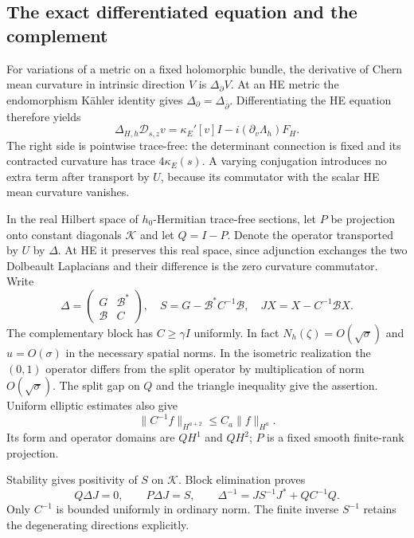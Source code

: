 \documentclass[11pt]{amsart}
\theoremstyle{definition}
\theoremstyle{remark}
\newcommand{\cK}{\mathcal K}
\newcommand{\cD}{\mathscr D}
\begin{document}
\subsection{The exact differentiated equation and the complement}
For variations of a metric on a fixed holomorphic bundle, the derivative
of Chern mean curvature in intrinsic direction $V$ is $\Delta_\partial V$.
At an HE metric the endomorphism K\"ahler identity gives
$\Delta_\partial=\Delta_{\bar\partial}$. Differentiating the HE equation
therefore yields
\begin{equation}\label{eq:differentiated-he}
 \Delta_{H,h}\cD_{s,z}v
 =\kappa_E'[v]I-i(\partial_v\Lambda_h)F_H.
\end{equation}
The right side is pointwise trace-free: the determinant connection is fixed
and its contracted curvature has trace $4\kappa_E(s)$. A varying
conjugation introduces no extra term after transport by $U$, because its
commutator with the scalar HE mean curvature vanishes.

In the real Hilbert space of $h_0$-Hermitian trace-free sections, let $P$
be projection onto constant diagonals $\cK$ and let $Q=I-P$. Denote the
operator transported by $U$ by $\Delta$. At HE it preserves this real
space, since adjunction exchanges the two Dolbeault Laplacians and their
difference is the zero curvature commutator. Write
\begin{equation}\label{eq:schur-blocks}
 \Delta=\begin{pmatrix}G&\mathcal B^*\\\mathcal B&C\end{pmatrix},
 \quad S=G-\mathcal B^*C^{-1}\mathcal B,\quad
 JX=X-C^{-1}\mathcal BX.
\end{equation}
The complementary block has $C\ge\gamma I$ uniformly. In fact
$N_h(\zeta)=O(\sqrt\sigma)$ and $u=O(\sigma)$ in the necessary
spatial norms. In the isometric realization the $(0,1)$ operator differs
from the split operator by multiplication of norm $O(\sqrt\sigma)$.
The split gap on $Q$ and the triangle inequality give the assertion.
Uniform elliptic estimates also give
\[
 \|C^{-1}f\|_{H^{a+2}}\le C_a\|f\|_{H^a}.
\]
Its form and operator domains are $QH^1$ and $QH^2$; $P$ is a fixed
smooth finite-rank projection.

Stability gives positivity of $S$ on $\cK$. Block elimination proves
\begin{equation}\label{eq:schur-inverse}
 Q\Delta J=0,\qquad P\Delta J=S,\qquad
 \Delta^{-1}=JS^{-1}J^*+QC^{-1}Q.
\end{equation}
Only $C^{-1}$ is bounded uniformly in ordinary norm. The finite inverse
$S^{-1}$ retains the degenerating directions explicitly.
\end{document}
